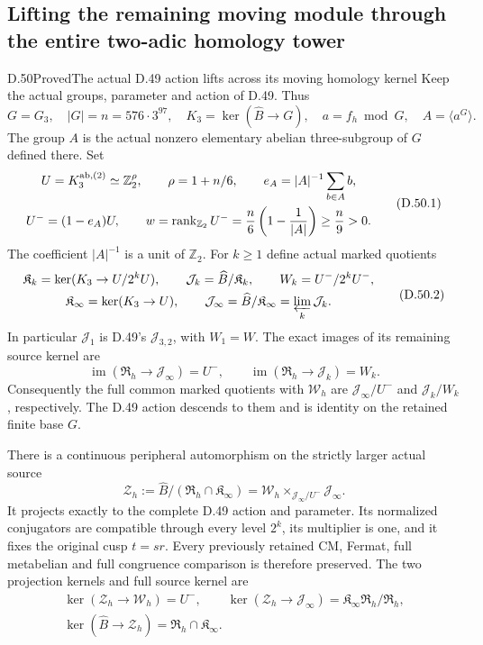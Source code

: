 \subsection{Lifting the remaining moving module through the entire two-adic homology tower}

\begin{statement}{D.50}{Proved}{The actual D.49 action lifts across its moving homology kernel}
Keep the actual groups, parameter and action of D.49. Thus
\[
 G=G_3,\quad |G|=n=576\cdot3^{97},\quad
 K_3=\ker(\widehat B\to G),\quad
 a=f_h\bmod G,\quad A=\langle a^G\rangle .
\]
The group \(A\) is the actual nonzero elementary abelian
three-subgroup of \(G\) defined there. Set
\[
 \begin{gathered}
 U=K_3^{\rm ab,(2)}\simeq\mathbb Z_2^\rho,\qquad
 \rho=1+n/6,\qquad
 e_A=|A|^{-1}\sum_{b\in A}b,\\
 U^-=(1-e_A)U,\qquad
 w=\operatorname{rank}_{\mathbb Z_2}U^-
       ={n\over6}\left(1-{1\over|A|}\right)
       \ge {n\over9}>0 .
 \end{gathered}
 \tag{D.50.1}
\]
The coefficient \(|A|^{-1}\) is a unit of \(\mathbb Z_2\).
For \(k\ge1\) define actual marked quotients
\[
 \begin{gathered}
 \mathfrak K_k=\ker(K_3\to U/2^kU),\qquad
 \mathcal J_k=\widehat B/\mathfrak K_k,\qquad
 W_k=U^-/2^kU^-,\\
 \mathfrak K_\infty=\ker(K_3\to U),\qquad
 \mathcal J_\infty=\widehat B/\mathfrak K_\infty
                         =\varprojlim_k\mathcal J_k .
 \end{gathered}
 \tag{D.50.2}
\]
In particular \(\mathcal J_1\) is D.49's
\(\mathcal J_{3,2}\), with \(W_1=W\). The exact images
of its remaining source kernel are
\[
 \operatorname{im}(\mathfrak R_h\to\mathcal J_\infty)=U^-,
 \qquad
 \operatorname{im}(\mathfrak R_h\to\mathcal J_k)=W_k.
 \tag{D.50.3}
\]
Consequently the full common marked quotients with
\(\mathcal W_h\) are \(\mathcal J_\infty/U^-\) and
\(\mathcal J_k/W_k\), respectively. The D.49 action
descends to them and is identity on the retained
finite base \(G\).

There is a continuous peripheral automorphism on
the strictly larger actual source
\[
 \mathcal Z_h
   :=\widehat B/(\mathfrak R_h\cap\mathfrak K_\infty)
    =\mathcal W_h
       \times_{\mathcal J_\infty/U^-}\mathcal J_\infty .
 \tag{D.50.4}
\]
It projects exactly to the complete D.49 action
and parameter. Its normalized conjugators are
compatible through every level \(2^k\), its multiplier
is one, and it fixes the original cusp \(t=sr\).
Every previously retained CM, Fermat, full metabelian
and full congruence comparison is therefore preserved.
The two projection kernels and full source kernel are
\[
 \begin{gathered}
 \ker(\mathcal Z_h\to\mathcal W_h)=U^-,\qquad
 \ker(\mathcal Z_h\to\mathcal J_\infty)
       =\mathfrak K_\infty\mathfrak R_h/\mathfrak R_h,\\
 \ker(\widehat B\to\mathcal Z_h)
       =\mathfrak R_h\cap\mathfrak K_\infty .
 \end{gathered}
 \tag{D.50.5}
\]


\end{statement}
